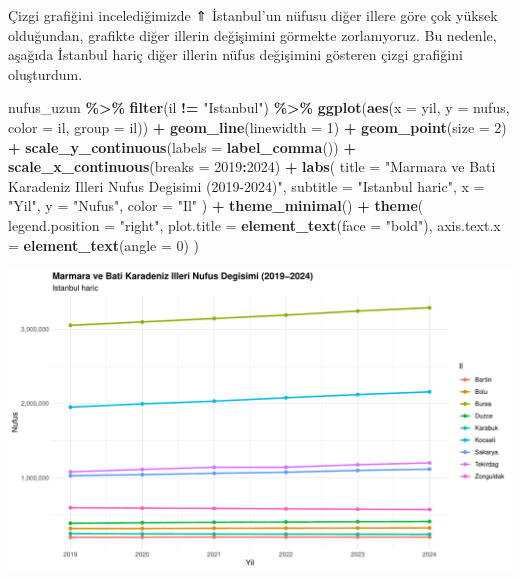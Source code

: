 \documentclass[
]{article}
\newenvironment{Shaded}{\begin{snugshade}}{\end{snugshade}}
\newcommand{\AttributeTok}[1]{\textcolor[rgb]{0.13,0.29,0.53}{#1}}
\newcommand{\DecValTok}[1]{\textcolor[rgb]{0.00,0.00,0.81}{#1}}
\newcommand{\FunctionTok}[1]{\textcolor[rgb]{0.13,0.29,0.53}{\textbf{#1}}}
\newcommand{\NormalTok}[1]{#1}
\newcommand{\SpecialCharTok}[1]{\textcolor[rgb]{0.81,0.36,0.00}{\textbf{#1}}}
\newcommand{\StringTok}[1]{\textcolor[rgb]{0.31,0.60,0.02}{#1}}
\begin{document}
Çizgi grafiğini incelediğimizde ⇑ İstanbul'un nüfusu diğer illere göre
çok yüksek olduğundan, grafikte diğer illerin değişimini görmekte
zorlanıyoruz. Bu nedenle, aşağıda İstanbul hariç diğer illerin nüfus
değişimini gösteren çizgi grafiğini oluşturdum.

\begin{Shaded}
\begin{Highlighting}[]
\NormalTok{nufus\_uzun }\SpecialCharTok{\%\textgreater{}\%}
  \FunctionTok{filter}\NormalTok{(il }\SpecialCharTok{!=} \StringTok{"Istanbul"}\NormalTok{) }\SpecialCharTok{\%\textgreater{}\%}
  \FunctionTok{ggplot}\NormalTok{(}\FunctionTok{aes}\NormalTok{(}\AttributeTok{x =}\NormalTok{ yil, }\AttributeTok{y =}\NormalTok{ nufus, }\AttributeTok{color =}\NormalTok{ il, }\AttributeTok{group =}\NormalTok{ il)) }\SpecialCharTok{+}
  \FunctionTok{geom\_line}\NormalTok{(}\AttributeTok{linewidth =} \DecValTok{1}\NormalTok{) }\SpecialCharTok{+}
  \FunctionTok{geom\_point}\NormalTok{(}\AttributeTok{size =} \DecValTok{2}\NormalTok{) }\SpecialCharTok{+}
  \FunctionTok{scale\_y\_continuous}\NormalTok{(}\AttributeTok{labels =} \FunctionTok{label\_comma}\NormalTok{()) }\SpecialCharTok{+}
  \FunctionTok{scale\_x\_continuous}\NormalTok{(}\AttributeTok{breaks =} \DecValTok{2019}\SpecialCharTok{:}\DecValTok{2024}\NormalTok{) }\SpecialCharTok{+}
  \FunctionTok{labs}\NormalTok{(}
    \AttributeTok{title =} \StringTok{"Marmara ve Bati Karadeniz Illeri Nufus Degisimi (2019{-}2024)"}\NormalTok{,}
    \AttributeTok{subtitle =} \StringTok{"Istanbul haric"}\NormalTok{,}
    \AttributeTok{x =} \StringTok{"Yil"}\NormalTok{,}
    \AttributeTok{y =} \StringTok{"Nufus"}\NormalTok{,}
    \AttributeTok{color =} \StringTok{"Il"}
\NormalTok{  ) }\SpecialCharTok{+}
  \FunctionTok{theme\_minimal}\NormalTok{() }\SpecialCharTok{+}
  \FunctionTok{theme}\NormalTok{(}
    \AttributeTok{legend.position =} \StringTok{"right"}\NormalTok{,}
    \AttributeTok{plot.title =} \FunctionTok{element\_text}\NormalTok{(}\AttributeTok{face =} \StringTok{"bold"}\NormalTok{),}
    \AttributeTok{axis.text.x =} \FunctionTok{element\_text}\NormalTok{(}\AttributeTok{angle =} \DecValTok{0}\NormalTok{)}
\NormalTok{  )}
\end{Highlighting}
\end{Shaded}

\includegraphics{cigdem_ucar_Rmarkdown_odevi_files/figure-latex/istanbul-haric-grafik-1.pdf}
\end{document}
